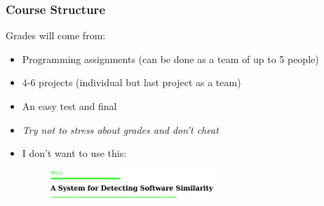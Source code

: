 \documentclass{beamer}
\begin{document}
\begin{frame}
  \frametitle{Course Structure}
  Grades will come from:
  \begin{itemize}
  \item<1-> Programming assignments (can be done as a team of up to 5 people)
  \item<2-> 4-6 projects (individual but last project as a team)    
  \item<3-> An easy test and final    
  \item<4-> \emph{Try not to stress about grades and \emph{don't cheat}}
  \item<5-> I don't want to use this:
    \begin{figure}[t]
      \includegraphics[width=0.6\textwidth]{images/moss.png}
    \end{figure}
  \end{itemize}
\end{frame}
\end{document}
